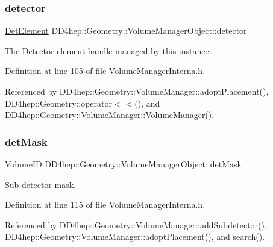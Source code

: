 \subsubsection{\texorpdfstring{detector}{detector}}
{\footnotesize\ttfamily \hyperlink{class_d_d4hep_1_1_geometry_1_1_det_element}{Det\+Element} D\+D4hep\+::\+Geometry\+::\+Volume\+Manager\+Object\+::detector}



The Detector element handle managed by this instance. 



Definition at line 105 of file Volume\+Manager\+Interna.\+h.



Referenced by D\+D4hep\+::\+Geometry\+::\+Volume\+Manager\+::adopt\+Placement(), D\+D4hep\+::\+Geometry\+::operator$<$$<$(), and D\+D4hep\+::\+Geometry\+::\+Volume\+Manager\+::\+Volume\+Manager().

\hypertarget{class_d_d4hep_1_1_geometry_1_1_volume_manager_object_aee03c6af6623d5d678c7cb870021e974}{}\label{class_d_d4hep_1_1_geometry_1_1_volume_manager_object_aee03c6af6623d5d678c7cb870021e974} 
\subsubsection{\texorpdfstring{det\+Mask}{detMask}}
{\footnotesize\ttfamily Volume\+ID D\+D4hep\+::\+Geometry\+::\+Volume\+Manager\+Object\+::det\+Mask}



Sub-\/detector mask. 



Definition at line 115 of file Volume\+Manager\+Interna.\+h.



Referenced by D\+D4hep\+::\+Geometry\+::\+Volume\+Manager\+::add\+Subdetector(), D\+D4hep\+::\+Geometry\+::\+Volume\+Manager\+::adopt\+Placement(), and search().

\hypertarget{class_d_d4hep_1_1_geometry_1_1_volume_manager_object_abe994d6c29e62e21c1fd2d2be21d041d}{}\label{class_d_d4hep_1_1_geometry_1_1_volume_manager_object_abe994d6c29e62e21c1fd2d2be21d041d} 
